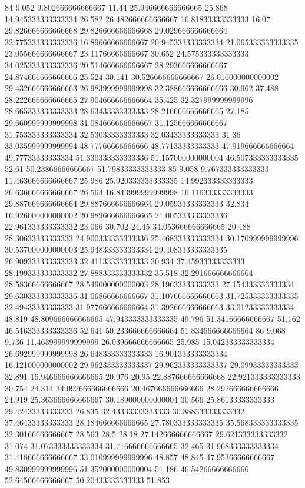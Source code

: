 84 9.052 9.802666666666667 11.44 25.946666666666665 25.868 14.945333333333334 26.582 26.482666666666667 16.81833333333333 16.07 29.826666666666668 29.826666666666668 29.029666666666664 32.775333333333336 16.89666666666667 20.945333333333334 21.065333333333335 23.055666666666667 23.11766666666667 30.652 24.575333333333333 34.025333333333336 20.514666666666667 28.293666666666667 24.874666666666666 25.524 30.141 30.526666666666667 26.016000000000002 29.432666666666663 26.983999999999998 32.388666666666666 30.962 37.488 28.222666666666665 27.904666666666664 35.425 32.327999999999996 28.665333333333333 28.63433333333333 28.216666666666665 27.185 29.660999999999998 31.084666666666667 31.125666666666667 31.753333333333334 32.53033333333333 32.03433333333333 31.36 33.035999999999994 48.77766666666666 48.77133333333333 47.919666666666664 49.77733333333334 51.330333333333336 51.157000000000004 46.507333333333335 52.61 50.23866666666667 51.79833333333333
85 9.058 9.767333333333333 11.463666666666667 25.986 25.920333333333335 14.992333333333333 26.636666666666667 26.564 16.843999999999998 16.116333333333333 29.887666666666664 29.887666666666664 29.05933333333333 32.834 16.926000000000002 20.989666666666665 21.005333333333336 22.961333333333332 23.066 30.702 24.45 34.053666666666665 20.488 28.30633333333333 24.900333333333336 25.468333333333334 30.170999999999996 30.537000000000003 25.948333333333334 29.408333333333335 26.909333333333333 32.41133333333333 30.934 37.45933333333333 28.199333333333332 27.888333333333332 35.518 32.291666666666664 28.58366666666667 28.549000000000003 28.19633333333333 27.154333333333334 29.630333333333336 31.06866666666667 31.107666666666663 31.725333333333335 32.49433333333333 31.977666666666664 31.392666666666663 33.01233333333334 48.819 48.809666666666665 47.943333333333335 49.796 51.34166666666667 51.162 46.516333333333336 52.641 50.233666666666664 51.834666666666664
86 9.068 9.736 11.463999999999999 26.039666666666665 25.985 15.042333333333334 26.692999999999998 26.648333333333333 16.901333333333334 16.121000000000002 29.962333333333337 29.962333333333337 29.09933333333333 32.891 16.946666666666665 20.976 20.95 22.887666666666668 22.921333333333333 30.754 24.314 34.092666666666666 20.467666666666666 28.292666666666666 24.919 25.363666666666667 30.189000000000004 30.566 25.86133333333333 29.42433333333333 26.835 32.43333333333333 30.888333333333332 37.46433333333333 28.184666666666665 27.780333333333335 35.568333333333335 32.30166666666667 28.563 28.5 28.18 27.142666666666667 29.621333333333332 31.074 31.073333333333334 31.716666666666665 32.465 31.968333333333334 31.418666666666667 33.010999999999996 48.857 48.845 47.95366666666667 49.830999999999996 51.352000000000004 51.186 46.54266666666666 52.64566666666667 50.20433333333333 51.853
